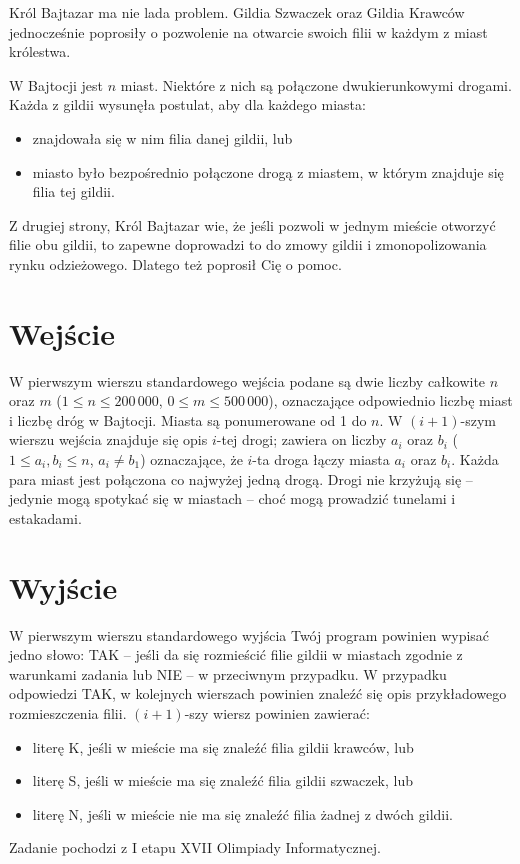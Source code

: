 \documentclass{spiral-kurs}
\begin{document}
\makeheader

Król Bajtazar ma nie lada problem. Gildia Szwaczek oraz Gildia Krawców jednocześnie poprosiły o pozwolenie na otwarcie swoich filii w każdym z miast królestwa.

W Bajtocji jest $n$ miast. Niektóre z nich są połączone dwukierunkowymi drogami. Każda z gildii wysunęła postulat, aby dla każdego miasta:

\begin{itemize}
  \item znajdowała się w nim filia danej gildii, lub
  \item miasto było bezpośrednio połączone drogą z miastem, w którym znajduje się filia tej gildii.
\end{itemize}

Z drugiej strony, Król Bajtazar wie, że jeśli pozwoli w jednym mieście otworzyć filie obu gildii, to zapewne doprowadzi to do zmowy gildii i zmonopolizowania rynku odzieżowego. Dlatego też poprosił Cię o pomoc.

\section{Wejście}
W pierwszym wierszu standardowego wejścia podane są dwie liczby całkowite $n$ oraz $m$ ($1 \le n \le 200\,000$, $0 \le m \le 500\,000$), oznaczające odpowiednio liczbę miast i liczbę dróg w Bajtocji. Miasta są ponumerowane od 1 do $n$. W $(i+1)$-szym wierszu wejścia znajduje się opis $i$-tej drogi; zawiera on liczby $a_i$ oraz $b_i$ ($1 \le a_i, b_i \le n$, $a_i \neq b_1$) oznaczające, że $i$-ta droga łączy miasta $a_i$ oraz $b_i$. Każda para miast jest połączona co najwyżej jedną drogą. Drogi nie krzyżują się -- jedynie mogą spotykać się w miastach -- choć mogą prowadzić tunelami i estakadami.

\section{Wyjście}
W pierwszym wierszu standardowego wyjścia Twój program powinien wypisać jedno słowo: TAK -- jeśli da się rozmieścić filie gildii w miastach zgodnie z warunkami zadania lub NIE -- w przeciwnym przypadku. W przypadku odpowiedzi TAK, w kolejnych wierszach powinien znaleźć się opis przykładowego rozmieszczenia filii. $(i+1)$-szy wiersz powinien zawierać:

\begin{itemize}
  \item literę K, jeśli w mieście ma się znaleźć filia gildii krawców, lub
  \item literę S, jeśli w mieście ma się znaleźć filia gildii szwaczek, lub
  \item literę N, jeśli w mieście nie ma się znaleźć filia żadnej z dwóch gildii.
\end{itemize}


\vfill
\noindent
Zadanie pochodzi z I etapu XVII Olimpiady Informatycznej.
\end{document}
